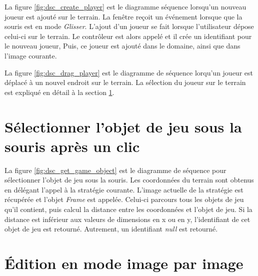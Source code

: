 La figure \ref{fig:dsc_create_player} est le diagramme séquence lorsqu'un nouveau joueur est ajouté sur le terrain.
La fenêtre reçoit un événement lorsque que la souris est en mode \textit{Glisser}.
L'ajout d'un joueur se fait lorsque l'utilisateur dépose celui-ci sur le terrain.
Le contrôleur est alors appelé et il crée un identifiant pour le nouveau joueur,
Puis, ce joueur est ajouté dans le domaine, ainsi que dans l'image courante.



La figure \ref{fig:dsc_drag_player} est le diagramme de séquence lorqu'un joueur est déplacé à un nouvel endroit sur le terrain.
La sélection du joueur sur le terrain est expliqué en détail à la section \ref{sec:convertir_clic_en_objet}.

\section{Sélectionner l'objet de jeu sous la souris après un clic}
\label{sec:convertir_clic_en_objet}


La figure \ref{fig:dsc_get_game_object} est le diagramme de séquence pour sélectionner l'objet de jeu sous la souris.
Les coordonnées du terrain sont obtenus en délégant l'appel à la stratégie courante.
L'image actuelle de la stratégie est récupérée et l'objet \textit{Frame} est appelée.
Celui-ci parcours tous les objets de jeu qu'il contient, puis calcul la distance entre les coordonnées et l'objet de jeu.
Si la distance est inférieur aux valeurs de dimensions en x ou en y, l'identifiant de cet objet de jeu est retourné.
Autrement, un identifiant \textit{null} est retourné.

\section{Édition en mode image par image}
\label{sec:edition_image_par_image}

